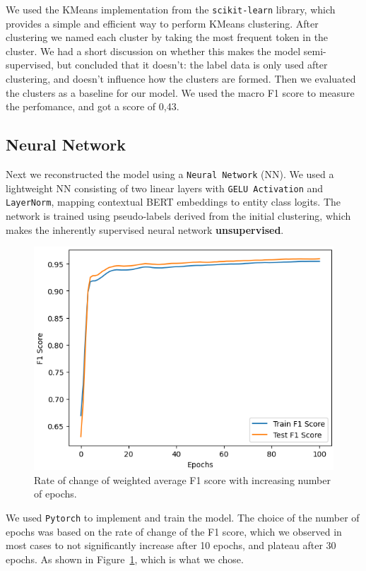 \documentclass[11pt]{article}
\begin{document}
We used the KMeans implementation from the \texttt{scikit-learn} library, which provides a simple and efficient way to perform KMeans clustering.
After clustering we named each cluster by taking the most frequent token in the cluster. We had a short discussion on whether this makes the model
semi-supervised, but concluded that it doesn't: the label data is only used after clustering, and doesn't influence how the clusters are formed.
Then we evaluated the clusters as a baseline for our model. We used the macro F1 score to measure the perfomance, and got a score of 0,43.

\subsection{Neural Network}

Next we reconstructed the model using a \texttt{Neural Network} (NN). We used a lightweight NN consisting of two linear layers with
\texttt{GELU Activation} and \texttt{LayerNorm}, mapping contextual BERT embeddings to entity class logits. The network is trained using
pseudo-labels derived from the initial clustering, which makes the inherently supervised neural network \textbf{unsupervised}.

\begin{figure}[H]
  \includegraphics[width=\columnwidth]{F1-Epochs.png}
  \caption{Rate of change of weighted average F1 score with increasing number of epochs.}
  \label{fig:F1-Epochs}
\end{figure}

We used \texttt{Pytorch} to implement and train the model. The choice of the number of epochs was based on the rate of change of the F1 score,
which we observed in most cases to not significantly increase after 10 epochs, and plateau after 30 epochs. As shown in Figure~\ref{fig:F1-Epochs},
which is what we chose.
\end{document}
